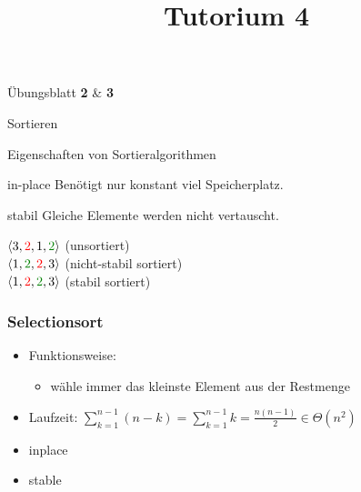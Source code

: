 
\title[Algorithmen I SS 14]{Tutorium 4}

\usepackage{alltt}





\begin{frame}
  \maketitle
\end{frame}

\begin{frame}
	\begin{center}
		\Huge
		Übungsblatt \textbf{2} \& \textbf{3}
	\end{center}
\end{frame}

\begin{frame}
	\begin{center}
		\Huge
		Sortieren
	\end{center}
\end{frame}

\begin{frame}{Eigenschaften von Sortieralgorithmen}
	\begin{block}{in-place}
		Benötigt nur konstant viel Speicherplatz.
	\end{block}
	\begin{block}{stabil}
		Gleiche Elemente werden nicht vertauscht.

		$\langle 3, {\color{red}{2}}, 1, {\color{english}{2}}\rangle$ (unsortiert)\\
		$\langle 1, {\color{english}{2}}, {\color{red}{2}}, 3\rangle$ (nicht-stabil sortiert)\\
		$\langle 1, {\color{red}{2}}, {\color{english}{2}}, 3\rangle$ (stabil sortiert)
	\end{block}
\end{frame}

\begin{frame}
	\frametitle{Selectionsort}
	\begin{itemize}
		\item Funktionsweise:
		\begin{itemize}
			\item wähle immer das kleinste Element aus der Restmenge
		\end{itemize}
		\item Laufzeit: $\sum_{k=1}^{n-1} (n - k) = \sum_{k=1}^{n-1} k = \frac{n(n-1)}{2} \in \Theta(n^2)$
		\item {\color{english}inplace}
		\item {\color{english}stable}
	\end{itemize}
\end{frame}

